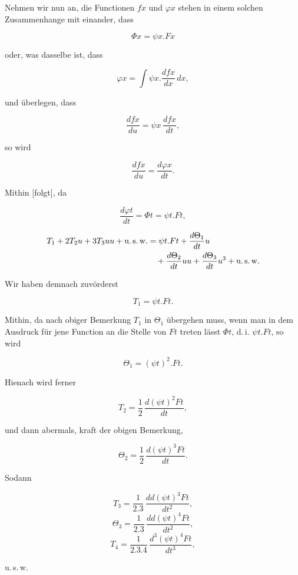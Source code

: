 %

Nehmen wir nun an, die Functionen $fx$ und $\varphi x$ stehen in einem solchen Zusammenhange mit einander, dass

\[ \Phi x = \psi x \mathord{.} Fx \]

\noindent oder, was dasselbe ist, dass

\[ \varphi x = \int \psi x \mathord{.} \frac{dfx}{dx}\,dx, \]

\noindent und überlegen, dass

\[ \frac{dfx}{du} = \psi x\,\frac{dfx}{dt}, \]

\noindent so wird

\[ \frac{dfx}{du} = \frac{d\varphi x}{dt}. \]

\noindent Mithin [folgt], da

\[ \frac{d\varphi t}{dt} = \Phi t = \psi t \mathord{.} Ft, \]

\[\begin{aligned}
T_1 + 2 T_2 u + 3 T_3 uu + \text{u.\,s.\,w.}
&= \psi t\mathord{.}Ft+\frac{d\Theta_1}{dt}u\\
&\quad+\frac{d\Theta_2}{dt}uu+\frac{d\Theta_3}{dt}u^3+\text{u.\,s.\,w.}
\end{aligned}\]

\noindent Wir haben demnach zuvörderst

\[ T_1 = \psi t \mathord{.} Ft. \]

\noindent Mithin, da nach obiger Bemerkung $T_1$ in $\Theta_1$ übergehen muss, wenn man in dem Ausdruck für jene Function an die Stelle von $Ft$ treten lässt $\Phi t$, d.\,i. $\psi t \mathord{.} Ft$, so wird

\[ \Theta_1 = (\psi t)^2 \mathord{.} Ft. \]

\noindent Hienach wird ferner

\[ T_2 = \frac{1}{2}\,\frac{d(\psi t)^2 Ft}{dt}, \]

\noindent und dann abermals, kraft der obigen Bemerkung,

\[ \Theta_2 = \frac{1}{2}\,\frac{d(\psi t)^3 Ft}{dt}. \]

\noindent Sodann

\[ T_3 = \frac{1}{2.3}\,\frac{dd(\psi t)^3 Ft}{dt^2}, \]
\[ \Theta_3 = \frac{1}{2.3}\,\frac{dd(\psi t)^4 Ft}{dt^2}, \]
\[ T_4 = \frac{1}{2.3.4}\,\frac{d^3(\psi t)^4 Ft}{dt^3}, \]

\begin{center}u.\,s.\,w.\end{center}
